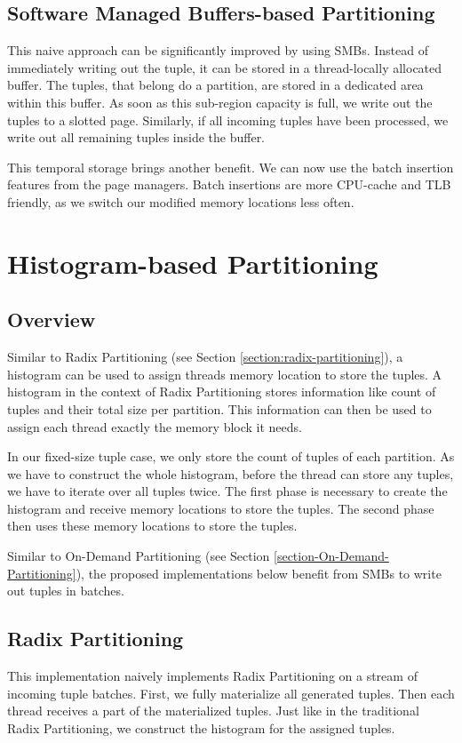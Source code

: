 \subsection{Software Managed Buffers-based Partitioning}

This naive approach can be significantly improved by using \acfp{SMB}.
Instead of immediately writing out the tuple, it can be stored in a thread-locally allocated buffer.
The tuples, that belong do a partition, are stored in a dedicated area within this buffer.
As soon as this sub-region capacity is full, we write out the tuples to a slotted page.
Similarly, if all incoming tuples have been processed, we write out all remaining tuples inside the buffer.

This temporal storage brings another benefit.
We can now use the batch insertion features from the page managers.
Batch insertions are more \ac{CPU}-cache and \ac{TLB} friendly, as we switch our modified memory locations less often.

\section{Histogram-based Partitioning}
\subsection{Overview}
Similar to Radix Partitioning (see Section \ref{section:radix-partitioning}), a histogram can be used to assign threads memory location to store the tuples.
A histogram in the context of Radix Partitioning stores information like count of tuples and their total size per partition.
This information can then be used to assign each thread exactly the memory block it needs.

In our fixed-size tuple case, we only store the count of tuples of each partition.
As we have to construct the whole histogram, before the thread can store any tuples, we have to iterate over all tuples twice.
The first phase is necessary to create the histogram and receive memory locations to store the tuples.
The second phase then uses these memory locations to store the tuples.

Similar to On-Demand Partitioning (see Section \ref{section-On-Demand-Partitioning}), the proposed implementations below benefit from \acfp{SMB} to write out tuples in batches.
\subsection{Radix Partitioning}
This implementation naively implements Radix Partitioning on a stream of incoming tuple batches.
First, we fully materialize all generated tuples.
Then each thread receives a part of the materialized tuples.
Just like in the traditional Radix Partitioning, we construct the histogram for the assigned tuples.

